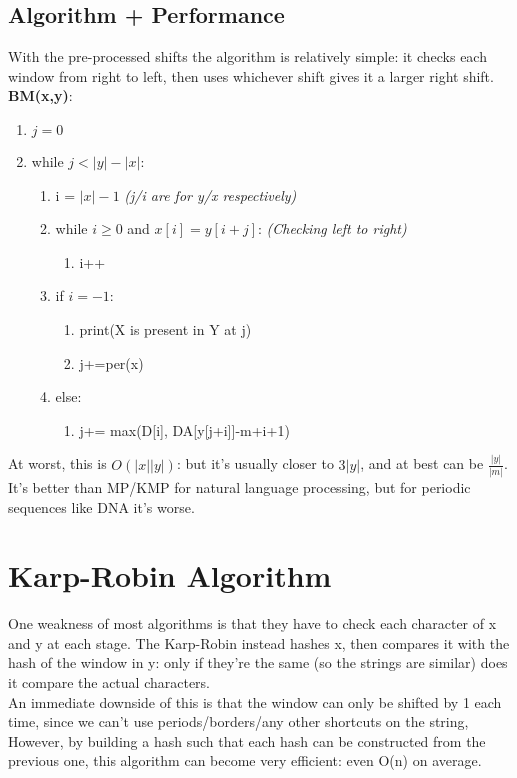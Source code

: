 \subsection{Algorithm + Performance}
With the pre-processed shifts the algorithm is relatively simple: it checks each window from right to left, then uses whichever shift gives it a larger right shift.\\
\textbf{BM(x,y)}:
\begin{enumerate}[label=\Alph*]
    \item \(j = 0  \)
    \item while \(j < |y| - |x|\):
\begin{enumerate}[label=\arabic*]
    \item i = $|x|-1$ \emph{(j/i are for y/x respectively)}
    \item while $i \geq 0$ and $x[i]=y[i+j]$: \emph{(Checking left to right)}
    \begin{enumerate}
        \item [] i++
    \end{enumerate}    
    \item if $i = -1$: 
    \begin{enumerate}
        \item print(X is present in Y at j)
        \item j+=per(x)
    \end{enumerate}      
    \item else:
    \begin{enumerate}
        \item [] j+= max(D[i], DA[y[j+i]]-m+i+1)
    \end{enumerate}  
\end{enumerate}    
\end{enumerate}
At worst, this is $O(|x||y|)$: but it's usually closer to $3|y|$, and at best can be $\frac{|y|}{|m|}$. It's better than MP/KMP for natural language processing, but for periodic sequences like DNA it's worse.

\newpage
\section{Karp-Robin Algorithm}
One weakness of most algorithms is that they have to check each character of x and y at each stage. The Karp-Robin instead hashes x, then compares it with the hash of the window in y: only if they're the same (so the strings are similar) does it compare the actual characters. \\ 
An immediate downside of this is that the window can only be shifted by 1 each time, since we can't use periods/borders/any other shortcuts on the string, However, by building a hash such that each hash can be constructed from the previous one, this algorithm can become very efficient: even O(n) on average.

